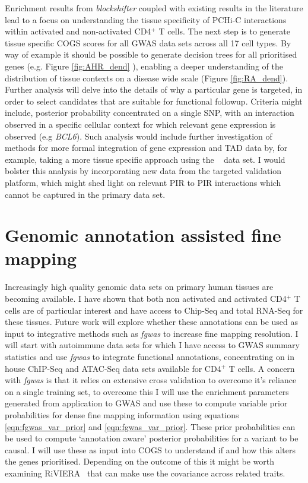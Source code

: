 \documentclass[a4paper,11pt]{report}
\begin{document}
Enrichment results from \textit{blockshifter} coupled with existing results in the literature  lead to a focus on understanding the tissue specificity of PCHi-C interactions within activated and non-activated CD4$^{+}$ T cells. The next step is to generate tissue specific COGS scores for all GWAS data sets across all 17 cell types. By way of example it should be possible to generate decision trees for all prioritised genes (e.g. Figure \ref{fig:AHR_dend} ), enabling a deeper understanding of the distribution of tissue contexts on a disease wide scale (Figure \ref{fig:RA_dend}). Further analysis will delve into the details of why a particular gene is targeted, in order to select candidates that are suitable for functional followup. Criteria might include,  posterior probability concentrated on a single SNP, with an interaction observed in a specific cellular context for which relevant gene expression is observed (e.g \textit{BCL6}). Such analysis would include further investigation of methods for more formal integration of gene expression and TAD data by, for example, taking a more tissue specific approach using the ~\citep{PetersLyonsLeeEtAl2016}  data set. I would bolster this analysis by incorporating new data from the targeted validation platform, which might shed light on relevant PIR to PIR interactions which cannot be captured in the primary data set.

\section{Genomic annotation assisted fine mapping} 

 Increasingly high quality genomic data sets on primary human tissues are becoming available. I have shown that both non activated and activated CD4$^{+}$ T cells are of particular interest and  have access to Chip-Seq and total RNA-Seq for these tissues. Future work will explore whether these annotations can be used as input to integrative methods such as \textit{fgwas} to increase fine mapping resolution. I will start with autoimmune data sets for which I have access to GWAS summary statistics and use \textit{fgwas} to integrate functional annotations, concentrating on in house ChIP-Seq and ATAC-Seq data sets available for CD4$^{+}$ T cells. A concern with \textit{fgwas} is that it relies on extensive cross validation to overcome it's reliance on a single training set, to overcome this I will use the enrichment parameters generated from application to GWAS and use these to compute variable prior probabilities for dense fine mapping information using equations \ref{eqn:fgwas_var_prior} and \ref{eqn:fgwas_var_prior}. These  prior probabilities can be used to compute `annotation aware' posterior probabilities for a variant to be causal. I will use these as input into COGS to understand if and how this alters the genes prioritised. Depending on the outcome of this it might be worth examining RiVIERA~\citep{LiKellis2016} that can make use the covariance across related traits.
\end{document}
